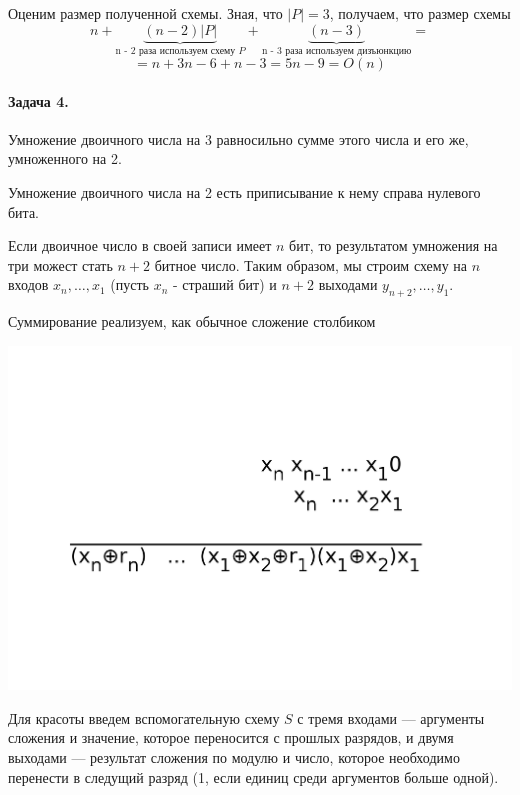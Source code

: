 \documentclass{article}
\begin{document}
    Оценим размер полученной схемы. Зная, что $|P| = 3$, получаем, что размер схемы 
    $$n + \underbrace{(n - 2)|P|}_{\text{n - 2 раза используем схему $P$}} + \underbrace{(n - 3)}_{\text{n - 3 раза используем дизъюнкцию}} = $$
    $$=  n + 3n - 6 + n - 3 = 5n - 9 = O(n)$$

    \paragraph{Задача 4.}
    Умножение двоичного числа на 3 равносильно сумме этого числа и его же, умноженного на 2.

    Умножение двоичного числа на 2 есть приписывание к нему справа нулевого бита.

    Если двоичное число в своей записи имеет $n$ бит, то результатом умножения на три можест стать $n + 2$ битное число. Таким образом, мы строим схему на $n$ входов $x_n, \ldots, x_1$ (пусть $x_n$ - страший бит) и $n + 2$ выходами $y_{n+2}, \ldots, y_{1} $.

    Суммирование реализуем, как обычное сложение столбиком
    \begin{center}
    \includegraphics[scale=0.7]{aaaa}
    \end{center}

    Для красоты введем вспомогательную схему $S$ с тремя входами --- аргументы сложения и значение, которое переносится с прошлых разрядов, и двумя выходами --- результат сложения по модулю и число, которое необходимо перенести в следущий разряд (1, если единиц среди аргументов больше одной).
\end{document}
